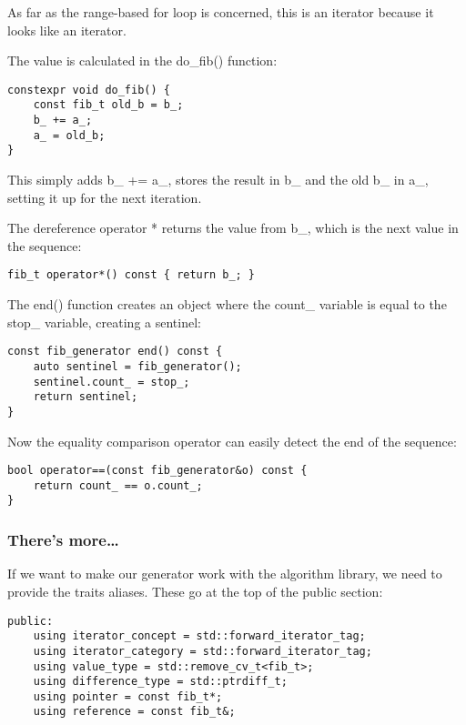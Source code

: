 As far as the range-based for loop is concerned, this is an iterator because it looks like an iterator.

The value is calculated in the do\_fib() function:

\begin{lstlisting}[style=styleCXX]
constexpr void do_fib() {
	const fib_t old_b = b_;
	b_ += a_;
	a_ = old_b;
}
\end{lstlisting}

This simply adds b\_ += a\_, stores the result in b\_ and the old b\_ in a\_, setting it up for the next iteration.

The dereference operator * returns the value from b\_, which is the next value in the sequence:

\begin{lstlisting}[style=styleCXX]
fib_t operator*() const { return b_; }
\end{lstlisting}

The end() function creates an object where the count\_ variable is equal to the stop\_ variable, creating a sentinel:

\begin{lstlisting}[style=styleCXX]
const fib_generator end() const {
	auto sentinel = fib_generator();
	sentinel.count_ = stop_;
	return sentinel;
}
\end{lstlisting}

Now the equality comparison operator can easily detect the end of the sequence:

\begin{lstlisting}[style=styleCXX]
bool operator==(const fib_generator&o) const {
	return count_ == o.count_;
}
\end{lstlisting}

\subsubsection{There's more…}

If we want to make our generator work with the algorithm library, we need to provide the traits aliases. These go at the top of the public section:

\begin{lstlisting}[style=styleCXX]
public:
	using iterator_concept = std::forward_iterator_tag;
	using iterator_category = std::forward_iterator_tag;
	using value_type = std::remove_cv_t<fib_t>;
	using difference_type = std::ptrdiff_t;
	using pointer = const fib_t*;
	using reference = const fib_t&;
\end{lstlisting}

